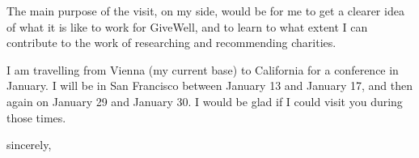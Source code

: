 \documentclass{letter}
\begin{document}
\begin{letter}{}

The main purpose of the visit, on my side, would be for me to get a clearer idea of what it is like to work for GiveWell, and to learn to what extent I can contribute to the work of researching and recommending charities.

I am travelling from Vienna (my current base) to California for a conference in January. I will be in San Francisco between January 13 and January 17, and then again on January 29 and January 30. I would be glad if I could visit you during those times.

%

\closing{sincerely,}
\end{letter}
\end{document}

